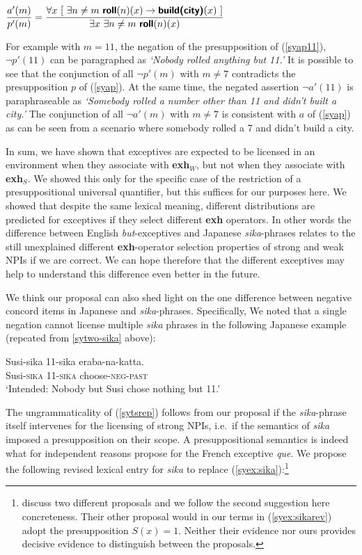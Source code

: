 \documentclass[output=paper,colorlinks,citecolor=brown,
]{langscibook}
\def\M#1{\textsc{#1}}
\begin{document}
\ea \label{syap11}$\displaystyle \frac{a'(m)}{p'(m)} = 
\frac{\forall x\ [\ \exists n \neq m\  \textsf{\textbf{roll}}(n)(x)  \rightarrow \textsf{\textbf{build(city)}}(x)\ ]}{\exists x\  \exists n \neq m\  \textsf{\textbf{roll}}(n)(x)}$
\z

For example with $m = 11$, the negation of the presupposition of (\ref{syap11}), $\neg p'(11)$ can be paragraphed as \emph{`Nobody rolled anything but 11.'}  It is possible to see that the conjunction of all $\neg p'(m)$ with $m \neq 7$ contradicts the presupposition $p$ of (\ref{syap}).   At the same time, the negated assertion $\neg a'(11)$ is paraphraseable as \emph{`Somebody rolled a number other than 11 and didn't built a city.'} The conjunction of all $\neg a'(m)$ with $m \neq 7$ is consistent with $a$ of (\ref{syap}) as can be seen from a scenario where somebody rolled a 7 and didn't build a city.

In sum, we have shown that exceptives are expected to be licensed in an environment when they associate with \textbf{exh}$_W$, but not when they associate with \textbf{exh}$_S$.  We showed this only for the specific case of the restriction of a presuppositional universal quantifier, but this suffices for our purposes here.  We showed that despite the same lexical meaning, different distributions are predicted for exceptives if they select different \textbf{exh} operators. 
In other words the difference between English \emph{but}-exceptives and Japanese \emph{sika}-phrases relates to the still unexplained different \textbf{exh}-operator selection properties of strong and weak NPIs if we are correct.  We can hope therefore that the different exceptives may help to understand this difference even better in the future.

We think our proposal can also shed light on the one difference between negative concord items in Japanese and \emph{sika}-phrases.  Specifically, We noted that a single negation cannot license multiple \emph{sika} phrases in the following Japanese example (repeated from \ref{sytwo-sika} above): 

\ea\label{sytsrep}
\gll *Susi-sika 11-sika eraba-na-katta.\\
Susi-\M{sika} 11-\M{sika} choose-\M{neg}-\M{past}\\
\trans `Intended: Nobody but Susi chose nothing but 11.'\z

The ungrammaticality of (\ref{sytsrep}) follows from our proposal if the \emph{sika}-phrase itself intervenes for the licensing of strong NPIs, i.e.\ if the semantics of \emph{sika} imposed a presupposition on their scope.  A presuppositional semantics is indeed what \cite[p.~461--2]{fintel07a} for independent reasons propose for the French exceptive \emph{que}. We propose the following revised lexical entry for \emph{sika} to replace  (\ref{syex:sika}):\footnote{\cite{fintel07a} discuss two different proposals and we follow the second suggestion here concreteness. Their other proposal would in our terms in (\ref{syex:sikarev}) adopt the presupposition $S(x)=1$.  Neither their evidence nor ours provides decisive evidence to distinguish between the proposals.}
\end{document}
